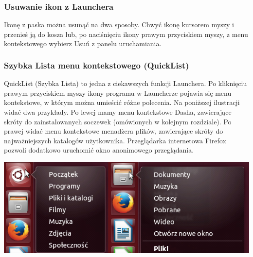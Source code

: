 \subsubsection{Usuwanie ikon z Launchera}
Ikonę z paska można usunąć na dwa sposoby. Chwyć ikonę kursorem myszy i przenieś ją do kosza lub, po naciśnięciu ikony prawym przyciskiem myszy, z menu kontekstowego wybierz \textcolor{ubuntu_orange}{Usuń z panelu uruchamiania}.

\subsubsection{Szybka Lista menu kontekstowego (QuickList)}
QuickList (Szybka Lista) to jedna z ciekawszych funkcji Launchera. Po kliknięciu prawym przyciskiem myszy ikony programu w Launcherze pojawia się menu kontekstowe, w którym można umieścić różne polecenia. Na poniższej ilustracji widać dwa przykłady. Po lewej mamy menu kontekstowe Dasha, zawierające skróty do zainstalowanych soczewek (omówionych w kolejnym rozdziale). Po prawej widać menu kontekstowe menadżera plików, zawierające skróty do najważniejszych katalogów użytkownika. Przeglądarka internetowa Firefox pozwoli dodatkowo uruchomić okno anonimowego przeglądania.

\begin{center}
	\includegraphics[width=\linewidth]{images/unity_launcher_quicklist.png}
\end{center}


